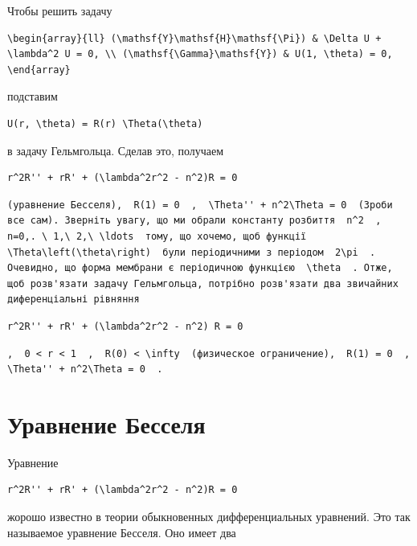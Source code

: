 \documentclass[
  ukrainian,
]{article}
\begin{document}
Чтобы решить задачу

\begin{verbatim}
\begin{array}{ll} (\mathsf{Y}\mathsf{H}\mathsf{\Pi}) & \Delta U + \lambda^2 U = 0, \\ (\mathsf{\Gamma}\mathsf{Y}) & U(1, \theta) = 0, \end{array}
\end{verbatim}

подставим

\begin{verbatim}
U(r, \theta) = R(r) \Theta(\theta)
\end{verbatim}

в задачу Гельмгольца. Сделав это, получаем

\begin{verbatim}
r^2R'' + rR' + (\lambda^2r^2 - n^2)R = 0
\end{verbatim}

\begin{verbatim}
(уравнение Бесселя),  R(1) = 0  ,  \Theta'' + n^2\Theta = 0  (Зроби все сам). Зверніть увагу, що ми обрали константу розбиття  n^2  ,  n=0,. \ 1,\ 2,\ \ldots  тому, що хочемо, щоб функції  \Theta\left(\theta\right)  були періодичними з періодом  2\pi  . Очевидно, що форма мембрани є періодичною функцією  \theta  . Отже, щоб розв'язати задачу Гельмгольца, потрібно розв'язати два звичайних диференціальні рівняння
\end{verbatim}

\begin{verbatim}
r^2R'' + rR' + (\lambda^2r^2 - n^2) R = 0
\end{verbatim}

\begin{verbatim}
,  0 < r < 1  ,  R(0) < \infty  (физическое ограничение),  R(1) = 0  ,  \Theta'' + n^2\Theta = 0  .
\end{verbatim}

\section{Уравнение
Бесселя}\label{ux443ux440ux430ux432ux43dux435ux43dux438ux435-ux431ux435ux441ux441ux435ux43bux44f}

Уравнение

\begin{verbatim}
r^2R'' + rR' + (\lambda^2r^2 - n^2)R = 0
\end{verbatim}

жорошо известно в теории обыкновенных дифференциальных уравнений. Это
так называемое уравнение Бесселя. Оно имеет два
\end{document}
